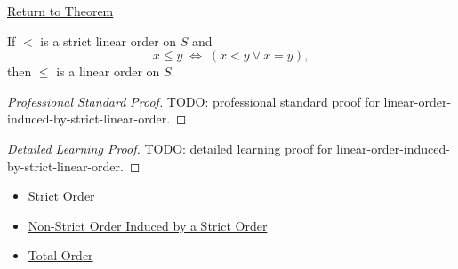 \newpage
{}
\label{prf:linear-order-induced-by-strict-linear-order}

\begin{remark*}[Return]
\hyperref[thm:linear-order-induced-by-strict-linear-order]{Return to Theorem}
\end{remark*}

\begin{theorem*}
If $<$ is a strict linear order on $S$ and
\[
x\leq y \;\Longleftrightarrow\; (x<y\lor x=y),
\]
then $\leq$ is a linear order on $S$.
\end{theorem*}

\begin{proof}[Professional Standard Proof]
\LRAProofBodyStart
TODO: professional standard proof for linear-order-induced-by-strict-linear-order.
\end{proof}

\begin{proof}[Detailed Learning Proof]
\LRAProofBodyStart
TODO: detailed learning proof for linear-order-induced-by-strict-linear-order.
\end{proof}

\begin{remark*}
\end{remark*}

\begin{dependencies}
\begin{itemize}
  \item \hyperref[def:strict-order]{Strict Order}
  \item \hyperref[def:non-strict-order-induced-by-strict-order]{Non-Strict Order Induced by a Strict Order}
  \item \hyperref[def:total-order]{Total Order}
\end{itemize}
\end{dependencies}

\clearpage
